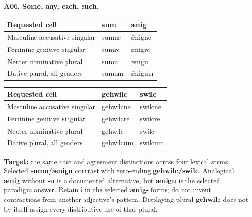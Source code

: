 \par\begin{minipage}{\linewidth}\raggedright
\textbf{A06. Some, any, each, such.}

\par\begingroup
\fontsize{10.5}{13.2}\selectfont
\setlength{\LTleft}{0pt}\setlength{\LTright}{\fill}
\noindent
\begin{tabular}{@{}>{\raggedright\arraybackslash}p{56.96mm}>{\raggedright\arraybackslash}p{30.71mm}>{\raggedright\arraybackslash}p{30.71mm}@{}}
\toprule
\textbf{Requested cell} & \textbf{sum} & \textbf{ǣnig} \\
\midrule
Masculine accusative singular & sumne & ǣnigne \\
Feminine genitive singular & sumre & ǣnigre \\
Neuter nominative plural & sumu & ǣnigu \\
Dative plural, all genders & sumum & ǣnigum \\
\bottomrule
\end{tabular}
\par\endgroup

\par\begingroup
\fontsize{10.5}{13.2}\selectfont
\setlength{\LTleft}{0pt}\setlength{\LTright}{\fill}
\noindent
\begin{tabular}{@{}>{\raggedright\arraybackslash}p{56.96mm}>{\raggedright\arraybackslash}p{30.71mm}>{\raggedright\arraybackslash}p{30.71mm}@{}}
\toprule
\textbf{Requested cell} & \textbf{gehwilc} & \textbf{swilc} \\
\midrule
Masculine accusative singular & gehwilcne & swilcne \\
Feminine genitive singular & gehwilcre & swilcre \\
Neuter nominative plural & gehwilc & swilc \\
Dative plural, all genders & gehwilcum & swilcum \\
\bottomrule
\end{tabular}
\par\endgroup

\textbf{Target:} the same case and agreement distinctions across four lexical stems. Selected \textbf{sumu/\allowbreak{}ǣnigu} contrast with zero-ending \textbf{gehwilc/\allowbreak{}swilc}. Analogical \textbf{ǣnig} without \textbf{-u} is a documented alternative, but \textbf{ǣnigu} is the selected paradigm answer. Retain \textbf{i} in the selected \textbf{ǣnig-} forms; do not invent contractions from another adjective's pattern. Displaying plural \textbf{gehwilc} does not by itself assign every distributive use of that plural.

\end{minipage}\par\addvspace{4pt}

